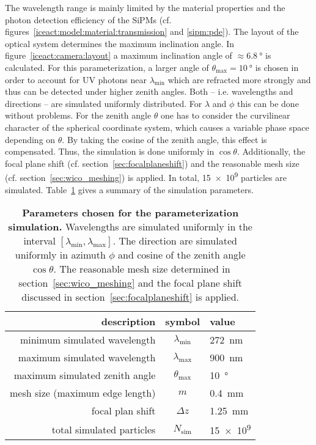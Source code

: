 The wavelength range is mainly limited by the material properties and the photon detection efficiency of the SiPMs (cf. figures~\ref{iceact:model:material:transmission} and \ref{sipm:pde}). The layout of the optical system determines the maximum inclination angle. In figure~\ref{iceact:camera:layout} a maximum inclination angle of $\approx\SI{6.8}{\degree}$ is calculated. For this parameterization, a larger angle of $\theta_\text{max}=\SI{10}{\degree}$ is chosen in order to account for UV photons near $\lambda_\text{min}$  which are refracted more strongly and thus can be detected under higher zenith angles. Both -- i.e. wavelengths and directions -- are simulated uniformly distributed. For $\lambda$ and $\phi$ this can be done without problems. For the zenith angle $\theta$ one has to consider the curvilinear character of the spherical coordinate system, which causes a variable phase space depending on $\theta$. By taking the cosine of the zenith angle, this effect is compensated. Thus, the simulation is done uniformly in $\cos{\theta}$. Additionally, the focal plane shift (cf. section~\ref{sec:focalplaneshift}) and the reasonable mesh size (cf. section~\ref{sec:wico_meshing}) is applied. In total, \num{15e9} particles are simulated. Table~\ref{paramsim:params} gives a summary of the simulation parameters.

\begin{table}[H]
	\centering
	\begin{tabular}{r|c|l}
		\toprule
		description 				   & symbol               & value\\
		\midrule
		minimum simulated wavelength   & $\lambda_\text{min}$ & \SI{272}{\nano\meter}\\
		maximum simulated wavelength   & $\lambda_\text{max}$ & \SI{900}{\nano\meter}\\
		maximum simulated zenith angle & $\theta_\text{max}$  & \SI{10}{\degree}\\
		mesh size (maximum edge length)& $m$				  & \SI{0.4}{\milli\meter}\\
		focal plan shift 			   & $\Delta z$			  & \SI{1.25}{\milli\meter}\\
		total simulated particles      & $N_\text{sim}$		  & \num{15e9}\\
		\bottomrule
	\end{tabular}
	\caption[Parameters chosen for the parameterization simulation]{\textbf{Parameters chosen for the parameterization simulation.} Wavelengths are simulated uniformly in the interval $[\lambda_\text{min}, \lambda_\text{max}]$. The direction are simulated uniformly in azimuth $\phi$ and cosine of the zenith angle $\cos{\theta}$. The reasonable mesh size determined in section~\ref{sec:wico_meshing} and the focal plane shift discussed in section~\ref{sec:focalplaneshift} is applied.}
	\label{paramsim:params}
\end{table}

